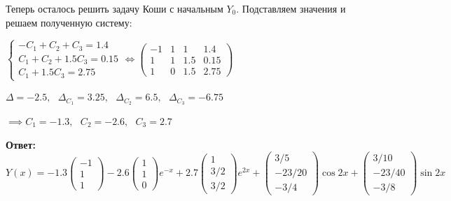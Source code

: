 \documentclass[a4paper, 12pt]{article}
\begin{document}
	\quad Теперь осталось решить задачу Коши с начальным $Y_0$. Подставляем значения и решаем полученную систему:
	
	\begin{center}
		$ \begin{cases}
			-C_1 +C_2 +C_3 = 1.4 \\
			C_1 + C_2 + 1.5C_3 = 0.15 \\
			C_1 + 1.5C_3 = 2.75
		\end{cases} \Leftrightarrow 
		\left(
		\begin{array}{ccc|c}
			-1 & 1 & 1 & 1.4 \\
			1 & 1 & 1.5 & 0.15 \\ 
			1 & 0 & 1.5 & 2.75
		\end{array}
		\right)$
		
		$\Delta = -2.5, \text{ } \Delta_{C_1} = 3.25, \text{ } \Delta_{C_2} = 6.5, \text{ } \Delta_{C_3} = -6.75$
		
		$\implies C_1 = -1.3, \text{ } C_2 = -2.6, \text{ } C_3 = 2.7$
	\end{center}
	
	\quad \textbf{Ответ:} $Y(x) = -1.3\left(
	\begin{array}{c}
		-1 \\
		1 \\
		1
	\end{array}
	\right) -2.6 \left(
	\begin{array}{c}
		1 \\
		1 \\
		0
	\end{array}
	\right) e^{-x} + 2.7 \left(
	\begin{array}{c}
		1 \\
		3/2 \\
		3/2
	\end{array}
	\right)e^{2x}  + \left( 
	\begin{array}{c}
		3/5 \\
		-23/20 \\
		-3/4
	\end{array}
	\right) \cos 2x + \left( 
	\begin{array}{c}
		3/10\\
		-23/40 \\
		-3/8
	\end{array}
	\right) \sin 2x $
	
	
\end{document}
